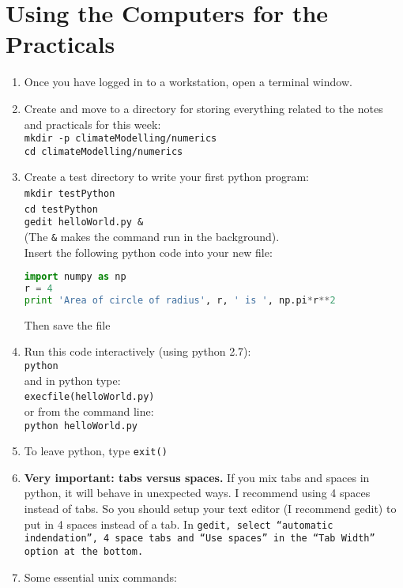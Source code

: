 %
\clearpage{}

%

\section{Using the Computers for the Practicals}
\begin{enumerate}
\item Once you have logged in to a workstation, open a terminal window.
\item Create and move to a directory for storing everything related to the
notes and practicals for this week:\\
\texttt{mkdir -p climateModelling/numerics}\\
\texttt{cd climateModelling/numerics}
\item Create a test directory to write your first python program:\\
\texttt{mkdir testPython}~\\
\texttt{cd testPython}~\\
\texttt{gedit helloWorld.py \&}\\
(The \texttt{\&} makes the command run in the background). \\
Insert the following python code into your new file:\\
\begin{lstlisting}[language=Python]
import numpy as np
r = 4
print 'Area of circle of radius', r, ' is ', np.pi*r**2
\end{lstlisting}
Then save the file
\item Run this code interactively (using python 2.7):\\
\texttt{python}\\
and in python type:\\
\texttt{execfile(\textquotedbl{}helloWorld.py\textquotedbl{})}~\\
or from the command line:\\
\texttt{python helloWorld.py}
\item To leave python, type \texttt{exit()}
\item \textbf{Very important: tabs versus spaces.} If you mix tabs and spaces
in python, it will behave in unexpected ways. I recommend using 4
spaces instead of tabs. So you should setup your text editor (I recommend
gedit) to put in 4 spaces instead of a tab. In \texttt{gedit, select
``automatic indendation'', 4 space tabs and ``Use spaces'' in
the ``Tab Width'' option at the bottom.}
\item Some essential unix commands:



\end{enumerate}
